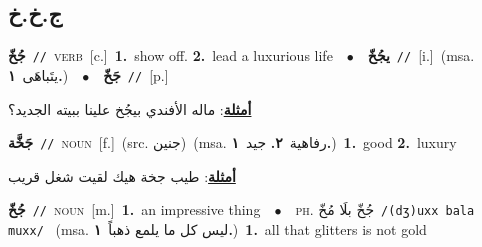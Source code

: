 \documentclass[10pt,a4paper,twoside]{article} %
\begin{document}
\begin{multicols}{2}
{{{{{{{{\vspace{-3mm}
\subsection*{\color{blue}\foreignlanguage{arabic}{ج.خ.خ}\color{blue}{}} 

{\setlength\topsep{0pt}\textbf{\foreignlanguage{arabic}{جُخّ}}\ {\color{gray}\texttt{//}\color{black}}\ \textsc{verb}\ [c.]\ \textbf{1.}~show off.  \textbf{2.}~lead a luxurious life\ \ $\bullet$\ \ \setlength\topsep{0pt}\textbf{\foreignlanguage{arabic}{يجُخّ}}\ {\color{gray}\texttt{//}\color{black}}\ [i.]\ \color{gray}(msa. \foreignlanguage{arabic}{يتَباهَى}~\foreignlanguage{arabic}{\textbf{١.}})\color{black}\ \ $\bullet$\ \ \setlength\topsep{0pt}\textbf{\foreignlanguage{arabic}{جَخّ}}\ {\color{gray}\texttt{//}\color{black}}\ [p.]\  \begin{flushright}\color{gray}\foreignlanguage{arabic}{\textbf{\underline{\foreignlanguage{arabic}{أمثلة}}}: ماله الأفندي بيجُخ علينا ببيته الجديد؟}\end{flushright}\color{black}} \vspace{2mm}

{\setlength\topsep{0pt}\textbf{\foreignlanguage{arabic}{جَخَّة}}\ {\color{gray}\texttt{//}\color{black}}\ \textsc{noun}\ [f.]\ (src. \color{gray}\foreignlanguage{arabic}{جنين}\color{black})\ \color{gray}(msa. \foreignlanguage{arabic}{رفاهية}~\foreignlanguage{arabic}{\textbf{٢.}}  \foreignlanguage{arabic}{جيد}~\foreignlanguage{arabic}{\textbf{١.}})\color{black}\ \textbf{1.}~good  \textbf{2.}~luxury\  \begin{flushright}\color{gray}\foreignlanguage{arabic}{\textbf{\underline{\foreignlanguage{arabic}{أمثلة}}}: طيب جخة هيك لقيت شغل قريب}\end{flushright}\color{black}} \vspace{2mm}

{\setlength\topsep{0pt}\textbf{\foreignlanguage{arabic}{جُخّ}}\ {\color{gray}\texttt{//}\color{black}}\ \textsc{noun}\ [m.]\ \textbf{1.}~an impressive thing\ \ $\bullet$\ \ \textsc{ph.} \color{gray} \foreignlanguage{arabic}{جُخّ بلَا مُخّ}\color{black}\ {\color{gray}\texttt{/{\sffamily (dʒ)uxx bala muxx}/}\color{black}}\ \color{gray} (msa. \foreignlanguage{arabic}{ليس كل ما يلمع ذهباً}~\foreignlanguage{arabic}{\textbf{١.}})\color{black}\ \textbf{1.}~all that glitters is not gold\ 

}}}}}}}}}
\end{multicols}
\end{document}
